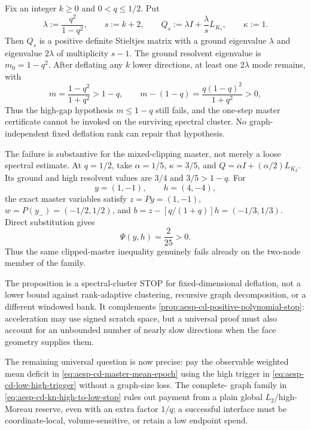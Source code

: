 \begin{proposition}
\label{prop:aesp-cd-fixed-rank-deflation-stop}
Fix an integer $k\geq0$ and $0<q\leq1/2$.  Put
\begin{equation*}
 \lambda:=\frac{q^2}{1-q^2},
 \qquad s:=k+2,
 \qquad
 Q_s:=\lambda I+\frac{\lambda}{s}L_{K_s},
 \qquad \kappa:=1.
\end{equation*}
Then $Q_s$ is a positive definite Stieltjes matrix with a ground eigenvalue
$\lambda$ and eigenvalue $2\lambda$ of multiplicity $s-1$.  The ground
resolvent eigenvalue is $m_0=1-q^2$.  After deflating any $k$ lower
directions, at least one $2\lambda$ mode remains, with
\begin{equation}
 m=\frac{1-q^2}{1+q^2}>1-q,
 \qquad
 m-(1-q)=\frac{q(1-q)^2}{1+q^2}>0,
 \label{eq:aesp-cd-fixed-rank-deflation-stop}
\end{equation}
Thus the high-gap hypothesis $m\leq1-q$ still fails, and the one-step master
certificate cannot be invoked on the surviving spectral cluster.  No
graph-independent fixed deflation rank can repair that hypothesis.

The failure is substantive for the mixed-clipping master, not merely a loose
spectral estimate.  At $q=1/2$, take
$\alpha=1/5$, $\kappa=3/5$, and
$Q=\alpha I+(\alpha/2)L_{K_2}$.  Its ground and high resolvent values are
$3/4$ and $3/5>1-q$.  For
\begin{equation*}
 y=(1,-1),\qquad h=(4,-4),
\end{equation*}
the exact master variables satisfy
$z=Py=(1,-1)$,
$w=P(y_-)=(-1/2,1/2)$, and
$b=z-[q/(1+q)]h=(-1/3,1/3)$.  Direct substitution gives
\begin{equation}
 \Psi(y,h)=\frac2{25}>0.
 \label{eq:aesp-cd-two-node-master-gap-stop}
\end{equation}
Thus the same clipped-master inequality genuinely fails already on the
two-node member of the family.
\end{proposition}

The proposition is a spectral-cluster STOP for fixed-dimensional deflation,
not a lower bound against rank-adaptive clustering, recursive graph
decomposition, or a different windowed bank.  It complements
\cref{prop:aesp-cd-positive-polynomial-stop}: acceleration may use signed
scratch space, but a universal proof must also account for an unbounded
number of nearly slow directions when the face geometry supplies them.

The remaining universal question is now precise: pay the observable weighted
mean deficit in \cref{eq:aesp-cd-master-mean-epoch} using the high trigger in
\cref{eq:aesp-cd-low-high-trigger} without a graph-size loss.  The complete-
graph family in \cref{eq:aesp-cd-kn-high-to-low-stop} rules out payment from a
plain global $L_2$/high-Moreau reserve, even with an extra factor $1/q$; a
successful interface must be coordinate-local, volume-sensitive, or retain a
low endpoint spend.
